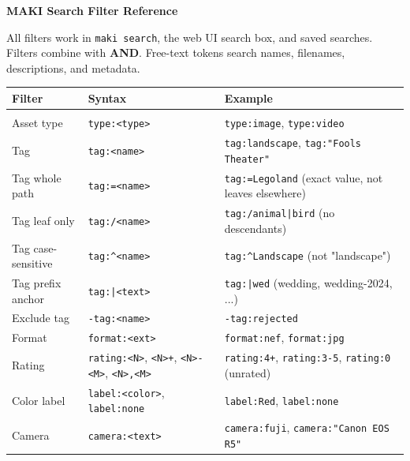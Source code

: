 \documentclass[a4paper,10pt]{extarticle}
\newcommand{\cmd}[1]{\texttt{#1}}
\begin{document}

\begin{center}
{\Large\bfseries\color{maki-salmon} MAKI Search Filter Reference}
\end{center}
\vspace{2pt}

All filters work in \cmd{maki search}, the web UI search box, and saved searches.
Filters combine with \textbf{AND}. Free-text tokens search names, filenames, descriptions, and metadata.

\vspace{6pt}

\renewcommand{\arraystretch}{1.1}
\small
\begin{tabularx}{\textwidth}{@{}l l X@{}}
\textbf{Filter} & \textbf{Syntax} & \textbf{Example} \\[2pt]
\hline\\[-6pt]
Asset type          & \cmd{type:<type>}                     & \cmd{type:image}, \cmd{type:video} \\
Tag                 & \cmd{tag:<name>}                      & \cmd{tag:landscape}, \cmd{tag:"Fools Theater"} \\
Tag whole path      & \cmd{tag:=<name>}                     & \cmd{tag:=Legoland} (exact value, not leaves elsewhere) \\
Tag leaf only       & \cmd{tag:/<name>}                     & \cmd{tag:/animal|bird} (no descendants) \\
Tag case-sensitive  & \cmd{tag:\textasciicircum<name>}      & \cmd{tag:\textasciicircum Landscape} (not "landscape") \\
Tag prefix anchor   & \cmd{tag:|<text>}                     & \cmd{tag:|wed} (wedding, wedding-2024, ...) \\
Exclude tag         & \cmd{-tag:<name>}                     & \cmd{-tag:rejected} \\
Format              & \cmd{format:<ext>}                    & \cmd{format:nef}, \cmd{format:jpg} \\
Rating              & \cmd{rating:<N>}, \cmd{<N>+}, \cmd{<N>-<M>}, \cmd{<N>,<M>} & \cmd{rating:4+}, \cmd{rating:3-5}, \cmd{rating:0} (unrated) \\
Color label         & \cmd{label:<color>}, \cmd{label:none}  & \cmd{label:Red}, \cmd{label:none} \\
Camera              & \cmd{camera:<text>}                   & \cmd{camera:fuji}, \cmd{camera:"Canon EOS R5"} \\

\end{tabularx}
\end{document}
